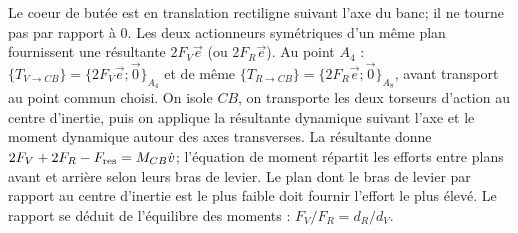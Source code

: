 \begin{corrigebox}
Le coeur de butée est en translation rectiligne suivant l'axe du banc;
                il ne tourne pas par rapport à 0.
Les deux actionneurs symétriques d'un même plan fournissent une
                résultante $2F_V\vec e$ (ou $2F_R\vec e$). Au point $A_4$ :
                $\{T_{V\to CB}\}=\{2F_V\vec e;\vec0\}_{A_4}$ et de même
                $\{T_{R\to CB}\}=\{2F_R\vec e;\vec0\}_{A_8}$, avant transport au point
                commun choisi.
On isole $CB$, on transporte les deux torseurs d'action au centre
                d'inertie, puis on applique la résultante dynamique suivant l'axe et le
                moment dynamique autour des axes transverses. La résultante donne
                $2F_V+2F_R-F_{\rm res}=M_{CB}\dot v$; l'équation de moment répartit les
                efforts entre plans avant et arrière selon leurs bras de levier.
Le plan dont le bras de levier par rapport au centre d'inertie est le
                plus faible doit fournir l'effort le plus élevé. Le rapport se déduit de
                l'équilibre des moments : $F_V/F_R=d_R/d_V$.
\end{corrigebox}
